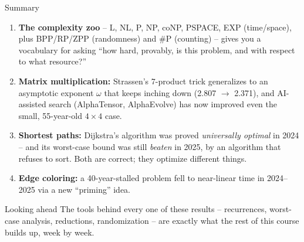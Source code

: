 \documentclass[11pt,aspectratio=169]{beamer}
\begin{document}
\begin{frame}{Summary}
  \begin{enumerate}
    \item \textbf{The complexity zoo} -- L, NL, P, NP, coNP, PSPACE, EXP (time/space),
    plus BPP/RP/ZPP (randomness) and \#P (counting) -- gives you a vocabulary for
    asking ``how hard, provably, is this problem, and with respect to what resource?''
    \item \textbf{Matrix multiplication:} Strassen's 7-product trick generalizes to an
    asymptotic exponent $\omega$ that keeps inching down (2.807 $\to$ 2.371), and
    AI-assisted search (AlphaTensor, AlphaEvolve) has now improved even the small,
    55-year-old $4\times 4$ case.
    \item \textbf{Shortest paths:} Dijkstra's algorithm was proved \emph{universally
    optimal} in 2024 -- and its worst-case bound was still \emph{beaten} in 2025, by
    an algorithm that refuses to sort. Both are correct; they optimize different things.
    \item \textbf{Edge coloring:} a 40-year-stalled problem fell to near-linear time in
    2024--2025 via a new ``priming'' idea.
  \end{enumerate}
  \begin{alertblock}{Looking ahead}
    The tools behind every one of these results -- recurrences, worst-case analysis,
    reductions, randomization -- are exactly what the rest of this course builds up,
    week by week.
  \end{alertblock}
\end{frame}
\end{document}
